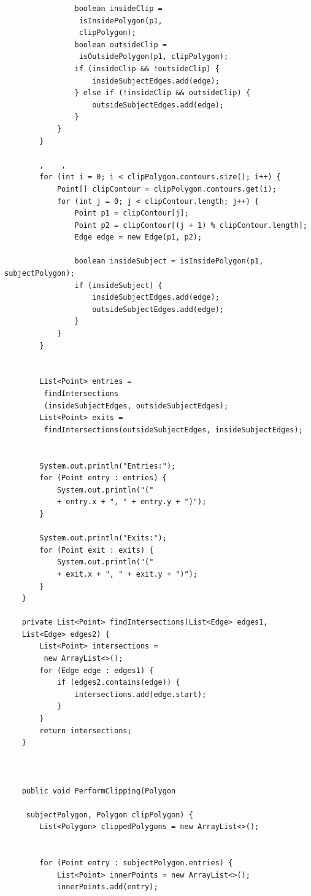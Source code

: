 \documentclass[12pt]{article}
\begin{document}
\begin{lstlisting}
                boolean insideClip =
                 isInsidePolygon(p1, 
                 clipPolygon);
                boolean outsideClip =
                 isOutsidePolygon(p1, clipPolygon);
                if (insideClip && !outsideClip) {
                    insideSubjectEdges.add(edge);
                } else if (!insideClip && outsideClip) {
                    outsideSubjectEdges.add(edge);
                }
            }
        }

        ,    ,    
        for (int i = 0; i < clipPolygon.contours.size(); i++) {
            Point[] clipContour = clipPolygon.contours.get(i);
            for (int j = 0; j < clipContour.length; j++) {
                Point p1 = clipContour[j];
                Point p2 = clipContour[(j + 1) % clipContour.length];
                Edge edge = new Edge(p1, p2);

                boolean insideSubject = isInsidePolygon(p1, subjectPolygon);
                if (insideSubject) {
                    insideSubjectEdges.add(edge);
                    outsideSubjectEdges.add(edge);
                }
            }
        }


        List<Point> entries =
         findIntersections
         (insideSubjectEdges, outsideSubjectEdges);
        List<Point> exits =
         findIntersections(outsideSubjectEdges, insideSubjectEdges);

        
        System.out.println("Entries:");
        for (Point entry : entries) {
            System.out.println("(" 
            + entry.x + ", " + entry.y + ")");
        }

        System.out.println("Exits:");
        for (Point exit : exits) {
            System.out.println("(" 
            + exit.x + ", " + exit.y + ")");
        }
    }

    private List<Point> findIntersections(List<Edge> edges1, 
    List<Edge> edges2) {
        List<Point> intersections =
         new ArrayList<>();
        for (Edge edge : edges1) {
            if (edges2.contains(edge)) {
                intersections.add(edge.start);
            }
        }
        return intersections;
    }



    public void PerformClipping(Polygon
    
     subjectPolygon, Polygon clipPolygon) {
        List<Polygon> clippedPolygons = new ArrayList<>();

       
        for (Point entry : subjectPolygon.entries) {
            List<Point> innerPoints = new ArrayList<>();
            innerPoints.add(entry);


\end{lstlisting}
\end{document}
